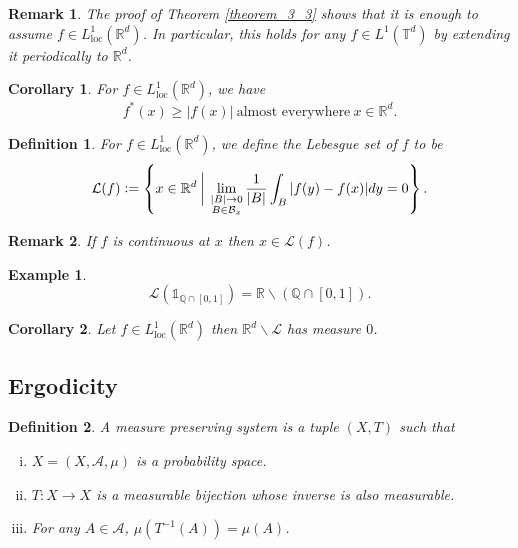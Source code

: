 \documentclass[8pt]{article}
\newtheorem{definition}{Definition}[section]
\newtheorem{remark}{Remark}[section]
\newtheorem{corollary}{Corollary} [section]
\newtheorem{example}{Example}[section]
\newcommand{\loc}[0]{\mathrm{loc}}
\newcommand{\alev}[0]{\:\text{almost everywhere}\:}
\newcommand{\ab}[1]{\vert #1 \vert}
\newcommand{\defeq}{\vcentcolon=}
\newcommand{\bR}[0]{\mathbb{R}}
\newcommand{\bT}[0]{\mathbb{T}}
\newcommand{\cL}[0]{\mathcal{L}}
\newcommand{\cB}[0]{\mathcal{B}}
\begin{document}
\begin{remark}
  The proof of Theorem \ref{theorem_3_3} shows that it is enough to assume $f\in L^1_\loc(\bR^d)$. In particular, this holds for any $f\in L^1(\bT^d)$ by extending it periodically to $\bR^d$.
\end{remark}

\begin{corollary}
  \label{corollary_3_4}
  For $f\in L^1_\loc(\bR^d)$, we have 
  \begin{equation*}
    f^*(x)\geq \ab{f(x)}\alev x\in\bR^d.
  \end{equation*}
\end{corollary}

\begin{definition}
  For $f\in L^1_\loc(\bR^d)$, we define the Lebesgue set of $f$ to be
  \begin{equation*}
    \cL(f) \defeq\left\{x\in\bR^d\:\bigg{\vert}\:\lim_{\substack{\ab{B}\to 0\\ B\in\cB_x}}{\frac 1 {\ab{B}}}\int_B\ab{f(y)-f(x)}dy = 0\right\}.
  \end{equation*}
\end{definition}

\begin{remark}
  If $f$ is continuous at $x$ then $x\in\cL(f)$.
\end{remark}

\begin{example}
  \begin{equation*}
    \cL(\mathds{1}_{\mathbb{Q}\cap[0,1]}) = \bR\backslash(\mathbb{Q}\cap[0,1]).
  \end{equation*}
\end{example}

\begin{corollary}
  \label{corollary_3_5}
  Let $f\in L^1_\loc(\bR^d)$ then $\bR^d\backslash\cL$ has measure $0$.
\end{corollary}

\subsection{Ergodicity}

\begin{definition}
  \label{definition_4_1}
  A measure preserving system is a tuple $(X,T)$ such that 
  \begin{enumerate}[i.]
    \item $X=(X,\mathcal{A},\mu)$ is a probability space.
    \item $T:X\to X$ is a measurable bijection whose inverse is also measurable.
    \item For any $A\in\mathcal{A}$, $\mu(T^{-1}(A)) = \mu(A)$.
  \end{enumerate}
\end{definition}
\end{document}
